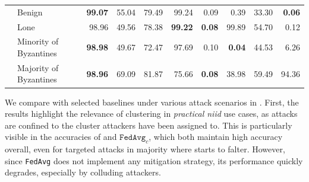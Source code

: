 \begin{table}[t]
\begin{tabular}{ll|rrrr|rrrr}
            & Benign & \textbf{99.07} & 55.04 & 79.49 & 99.24 & 0.09  & 0.39 & 33.30 & \textbf{0.06} \\
            & Lone & 98.96 & 49.56 & 78.38 & \textbf{99.22} &\textbf{0.08} & 99.89 & 54.70 & 0.12 \\
            & Minority of Byzantines & \textbf{98.98} & 49.67 & 72.47 & 97.69 & 0.10 & \textbf{0.04} & 44.53 & 6.26 \\
            & Majority of Byzantines & \textbf{98.96} & 69.09 & 81.87 & 75.66 & \textbf{0.08} & 38.98 & 59.49 & 94.36 \\          
          \bottomrule %
      \end{tabular}
  
  \end{table}

We compare \thecontrib with selected baselines under various attack scenarios in . 
First, the results highlight the relevance of clustering in  \emph{practical \gls{niid}} use cases, as attacks are confined to the cluster attackers have been assigned to.
This is particularly visible in the accuracies of \thecontrib and $\texttt{FedAvg}_c$, which both maintain high accuracy overall, even for targeted attacks in majority where \thecontrib starts to falter. 
However, since \texttt{FedAvg} does not implement any mitigation strategy, its performance quickly degrades, especially by colluding attackers.

%

